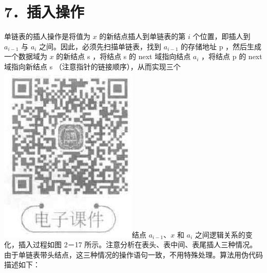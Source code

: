\documentclass[10pt]{article}
\begin{document}
\section*{7．插入操作}
单链表的插人操作是将值为 $x$ 的新结点插人到单链表的第 $i$ 个位置，即插人到 $a_{i-1}$ 与 $a_{i}$ 之间。因此，必须先扫描单链表，找到 $a_{i-1}$ 的存储地址 p ，然后生成一个数据域为 $x$ 的新结点 s ，将结点 s 的 next 域指向结点 $a_{i}$ ，将结点 p 的 next 域指向新结点 s （注意指针的链接顺序），从而实现三个\\
\includegraphics[max width=\textwidth]{2025_06_06_704745ea57b15b2333e5g-057}结点 $a_{i-1} 、 x$ 和 $a_{i}$ 之间逻辑关系的变化，插入过程如图 2－17 所示。注意分析在表头、表中间、表尾插人三种情况。由于单链表带头结点，这三种情况的操作语句一致，不用特殊处理。算法用伪代码描述如下：
\end{document}
